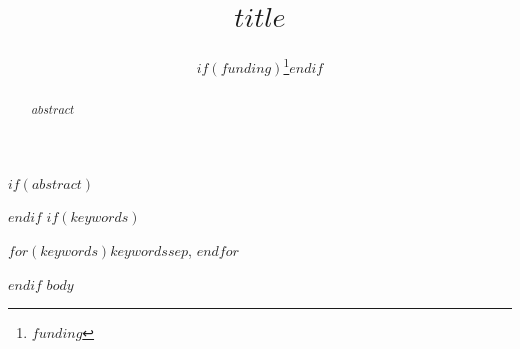 \documentclass[$for(classoption)$$classoption$$sep$,$endfor$]{$documentclass$}
\begin{document}
\title{$title$}
\author{
$if(funding)$\thanks{$funding$}$endif$}
\maketitle
$if(abstract)$\begin{abstract}$abstract$\end{abstract}$endif$
$if(keywords)$\begin{IEEEkeywords}$for(keywords)$$keywords$$sep$, $endfor$\end{IEEEkeywords}$endif$
$body$


\end{document}
